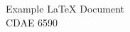 \documentclass[11pt]{article}
\begin{document}

\begin{center}
    {\huge Example LaTeX Document} \\
    \vspace{0.5em}
    {\large CDAE 6590} \\
\end{center}

\noindent




\end{document}
